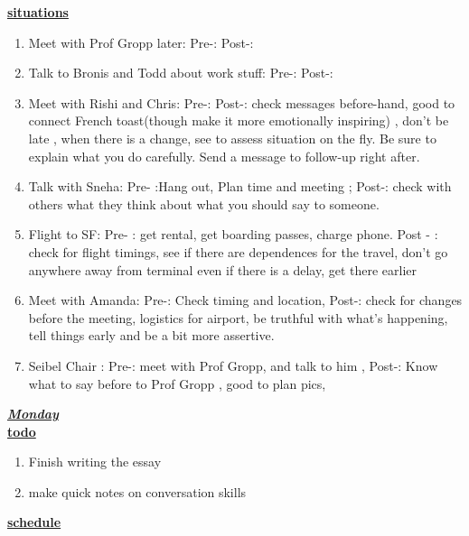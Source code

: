\underline{\textbf{situations}} \\
\begin{enumerate}


\item Meet with Prof Gropp later: Pre-:  Post-:

\item Talk to Bronis and Todd about work stuff:  Pre-:  Post-:

\item Meet with Rishi and Chris: Pre-:  Post-:  check messages before-hand, good
to connect French toast(though make it more emotionally inspiring) ,
don't be late , when there is a change, see to assess situation on the
fly. Be sure to explain what you do carefully. Send a message to
follow-up right after.

\item Talk with Sneha: Pre- :Hang out, Plan time and meeting ;  Post-:
check with others what they think about what you should say to
 someone.

 \item Flight to SF:   Pre- :  get rental,  get boarding passes, charge
phone.  Post - : check for flight timings, see if there are
dependences for the travel, don't go anywhere away from terminal even
if there is a delay, get there earlier

\item Meet with Amanda:  Pre-: Check timing and location,
Post-: check for changes before the meeting,  logistics for airport,
be truthful with what's happening, tell things early and be a bit more
assertive.

\item Seibel Chair :  Pre-: meet with Prof Gropp, and talk to him ,
Post-: Know what to say before to Prof Gropp , good to plan pics,

\end{enumerate}

\underline{\textbf{\textit{Monday}}}\\
\underline{\textbf{todo}}\\
\begin{enumerate}
\item Finish writing the essay 
\item make quick notes on conversation skills 
\end{enumerate}

\underline{\textbf{schedule}}\\
\begin{itemize}
\end{itemize}

